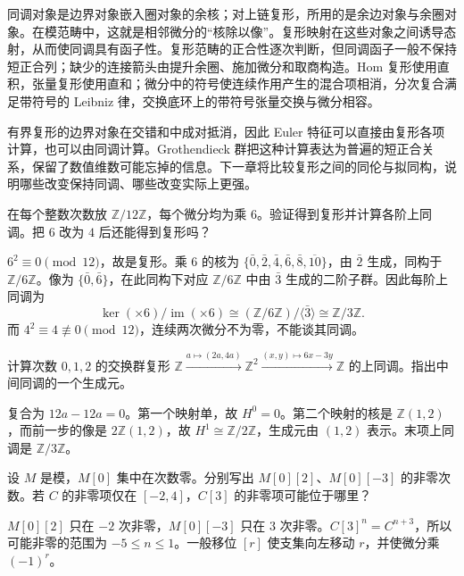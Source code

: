 \begin{chaptersummary}
	同调对象是边界对象嵌入圈对象的余核；对上链复形，所用的是余边对象与余圈对象。在模范畴中，这就是相邻微分的“核除以像”。复形映射在这些对象之间诱导态射，从而使同调具有函子性。复形范畴的正合性逐次判断，但同调函子一般不保持短正合列；缺少的连接箭头由提升余圈、施加微分和取商构造。Hom 复形使用直积，张量复形使用直和；微分中的符号使连续作用产生的混合项相消，分次复合满足带符号的 Leibniz 律，交换底环上的带符号张量交换与微分相容。

	\ProseParagraphBreak
	有界复形的边界对象在交错和中成对抵消，因此 Euler 特征可以直接由复形各项计算，也可以由同调计算。Grothendieck 群把这种计算表达为普遍的短正合关系，保留了数值维数可能忘掉的信息。下一章将比较复形之间的同伦与拟同构，说明哪些改变保持同调、哪些改变实际上更强。
\end{chaptersummary}

\BookExercises

\begin{exercise}\label{b4:ex:05-periodic}
	在每个整数次数放 \(\mathbb Z/12\mathbb Z\)，每个微分均为乘 \(6\)。验证得到复形并计算各阶上同调。把 \(6\) 改为 \(4\) 后还能得到复形吗？
\end{exercise}
\begin{solution}
	\(6^2\equiv0\pmod {12}\)，故是复形。乘 \(6\) 的核为 \(\{\bar0,\bar2,\bar4,\bar6,\bar8,\overline{10}\}\)，由 \(\bar2\) 生成，同构于 \(\mathbb Z/6\mathbb Z\)。像为 \(\{\bar0,\bar6\}\)，在此同构下对应 \(\mathbb Z/6\mathbb Z\) 中由 \(\bar3\) 生成的二阶子群。因此每阶上同调为
	\[
		\ker(\times6)/\operatorname{im}(\times6) \cong(\mathbb Z/6\mathbb Z)/\langle\bar3\rangle \cong\mathbb Z/3\mathbb Z.
	\]
	而 \(4^2\equiv4\not\equiv0\pmod {12}\)，连续两次微分不为零，不能谈其同调。
\end{solution}

\begin{exercise}\label{b4:ex:05-integer-matrices}
	计算次数 \(0,1,2\) 的交换群复形 \(\mathbb Z\xrightarrow{a\mapsto(2a,4a)}\mathbb Z^2 \xrightarrow{(x,y)\mapsto6x-3y}\mathbb Z\) 的上同调。指出中间同调的一个生成元。
\end{exercise}
\begin{solution}
	复合为 \(12a-12a=0\)。第一个映射单，故 \(H^0=0\)。第二个映射的核是 \(\mathbb Z(1,2)\)，而前一步的像是 \(2\mathbb Z(1,2)\)，故 \(H^1\cong\mathbb Z/2\mathbb Z\)，生成元由 \((1,2)\) 表示。末项上同调是 \(\mathbb Z/3\mathbb Z\)。
\end{solution}

\begin{exercise}\label{b4:ex:05-shift-support}
	设 \(M\) 是模，\(M[0]\) 集中在次数零。分别写出 \(M[0][2]\)、\(M[0][-3]\) 的非零次数。若 \(C\) 的非零项仅在 \([-2,4]\)，\(C[3]\) 的非零项可能位于哪里？
\end{exercise}
\begin{solution}
	\(M[0][2]\) 只在 \(-2\) 次非零，\(M[0][-3]\) 只在 \(3\) 次非零。\(C[3]^n=C^{n+3}\)，所以可能非零的范围为 \(-5\le n\le1\)。一般移位 \([r]\) 使支集向左移动 \(r\)，并使微分乘 \((-1)^r\)。
\end{solution}

